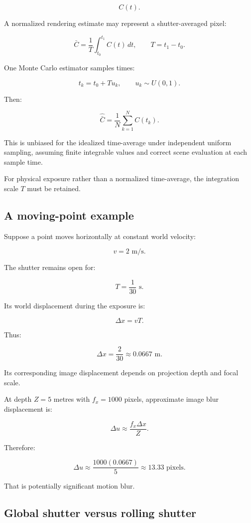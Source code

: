 \[ C(t). \]

A normalized rendering estimate may represent a shutter-averaged pixel:

\[ \boxed{ \bar C= \frac1T\int_{t_0}^{t_1}C(t)\,dt, \qquad T=t_1-t_0. } \]

One Monte Carlo estimator samples times:

\[ t_k=t_0+Tu_k, \qquad u_k\sim U(0,1). \]

Then:

\[ \boxed{ \widehat{\bar C} = \frac1N\sum_{k=1}^{N}C(t_k). } \]

This is unbiased for the idealized time-average under independent uniform sampling, assuming finite integrable values and correct scene evaluation at each sample time.

For physical exposure rather than a normalized time-average, the integration scale \(T\) must be retained.

\subsection{A moving-point example}\label{02-foundations-ii-ch036-a-moving-point-example}

\hypertarget{02-foundations-ii-ch036-a-moving-point-example}{}

Suppose a point moves horizontally at constant world velocity:

\[ v=2\text{ m/s}. \]

The shutter remains open for:

\[ T=\frac1{30}\text{ s}. \]

Its world displacement during the exposure is:

\[ \Delta x=vT. \]

Thus:

\[ \boxed{ \Delta x=\frac2{30}\approx0.0667\text{ m}. } \]

Its corresponding image displacement depends on projection depth and focal scale.

At depth \(Z=5\) metres with \(f_x=1000\) pixels, approximate image blur displacement is:

\[ \Delta u\approx\frac{f_x\Delta x}{Z}. \]

Therefore:

\[ \Delta u\approx \frac{1000(0.0667)}5 \approx\boxed{13.33\text{ pixels}}. \]

That is potentially significant motion blur.

\subsection{Global shutter versus rolling shutter}\label{02-foundations-ii-ch036-global-shutter-versus-rolling-shutter}

